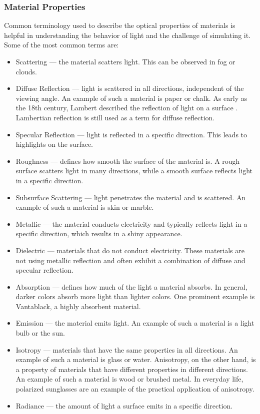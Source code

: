 \subsubsection{Material Properties}

Common terminology used to describe the optical properties of materials is helpful in understanding the behavior of light and the challenge of simulating it. Some of the most common terms are:

\begin{itemize}
  \item{Scattering} — the material scatters light. This can be observed in fog or clouds.
  \item{Diffuse Reflection} — light is scattered in all directions, independent of the viewing angle. An example of such a material is paper or chalk. As early as the 18th century, Lambert described the reflection of light on a surface \cite{lambert1760photometria}. Lambertian reflection is still used as a term for diffuse reflection.
  \item{Specular Reflection} — light is reflected in a specific direction. This leads to highlights on the surface.
  \item{Roughness} — defines how smooth the surface of the material is. A rough surface scatters light in many directions, while a smooth surface reflects light in a specific direction.
  \item{Subsurface Scattering} — light penetrates the material and is scattered. An example of such a material is skin or marble.
  \item{Metallic} — the material conducts electricity and typically reflects light in a specific direction, which results in a shiny appearance.
  \item{Dielectric} — materials that do not conduct electricity. These materials are not using metallic reflection and often exhibit a combination of diffuse and specular reflection.
  \item{Absorption} — defines how much of the light a material absorbs. In general, darker colors absorb more light than lighter colors. One prominent example is Vantablack, a highly absorbent material.
  \item{Emission} — the material emits light. An example of such a material is a light bulb or the sun.
  \item{Isotropy} — materials that have the same properties in all directions. An example of such a material is glass or water. Anisotropy, on the other hand, is a property of materials that have different properties in different directions. An example of such a material is wood or brushed metal. In everyday life, polarized sunglasses are an example of the practical application of anisotropy.
  \item{Radiance} — the amount of light a surface emits in a specific direction.
\end{itemize}


